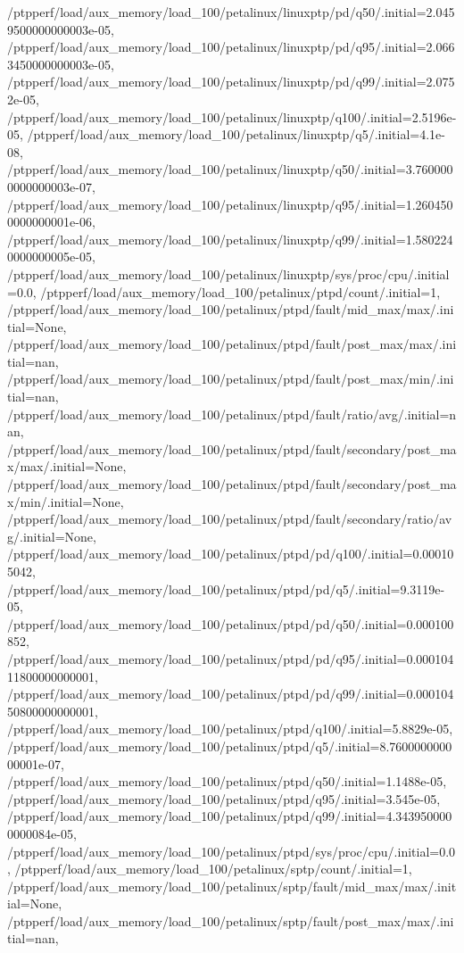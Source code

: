 {    /ptpperf/load/aux_memory/load_100/petalinux/linuxptp/pd/q50/.initial=2.0459500000000003e-05,
    /ptpperf/load/aux_memory/load_100/petalinux/linuxptp/pd/q95/.initial=2.0663450000000003e-05,
    /ptpperf/load/aux_memory/load_100/petalinux/linuxptp/pd/q99/.initial=2.0752e-05,
    /ptpperf/load/aux_memory/load_100/petalinux/linuxptp/q100/.initial=2.5196e-05,
    /ptpperf/load/aux_memory/load_100/petalinux/linuxptp/q5/.initial=4.1e-08,
    /ptpperf/load/aux_memory/load_100/petalinux/linuxptp/q50/.initial=3.7600000000000003e-07,
    /ptpperf/load/aux_memory/load_100/petalinux/linuxptp/q95/.initial=1.2604500000000001e-06,
    /ptpperf/load/aux_memory/load_100/petalinux/linuxptp/q99/.initial=1.5802240000000005e-05,
    /ptpperf/load/aux_memory/load_100/petalinux/linuxptp/sys/proc/cpu/.initial=0.0,
    /ptpperf/load/aux_memory/load_100/petalinux/ptpd/count/.initial=1,
    /ptpperf/load/aux_memory/load_100/petalinux/ptpd/fault/mid_max/max/.initial=None,
    /ptpperf/load/aux_memory/load_100/petalinux/ptpd/fault/post_max/max/.initial=nan,
    /ptpperf/load/aux_memory/load_100/petalinux/ptpd/fault/post_max/min/.initial=nan,
    /ptpperf/load/aux_memory/load_100/petalinux/ptpd/fault/ratio/avg/.initial=nan,
    /ptpperf/load/aux_memory/load_100/petalinux/ptpd/fault/secondary/post_max/max/.initial=None,
    /ptpperf/load/aux_memory/load_100/petalinux/ptpd/fault/secondary/post_max/min/.initial=None,
    /ptpperf/load/aux_memory/load_100/petalinux/ptpd/fault/secondary/ratio/avg/.initial=None,
    /ptpperf/load/aux_memory/load_100/petalinux/ptpd/pd/q100/.initial=0.000105042,
    /ptpperf/load/aux_memory/load_100/petalinux/ptpd/pd/q5/.initial=9.3119e-05,
    /ptpperf/load/aux_memory/load_100/petalinux/ptpd/pd/q50/.initial=0.000100852,
    /ptpperf/load/aux_memory/load_100/petalinux/ptpd/pd/q95/.initial=0.00010411800000000001,
    /ptpperf/load/aux_memory/load_100/petalinux/ptpd/pd/q99/.initial=0.00010450800000000001,
    /ptpperf/load/aux_memory/load_100/petalinux/ptpd/q100/.initial=5.8829e-05,
    /ptpperf/load/aux_memory/load_100/petalinux/ptpd/q5/.initial=8.760000000000001e-07,
    /ptpperf/load/aux_memory/load_100/petalinux/ptpd/q50/.initial=1.1488e-05,
    /ptpperf/load/aux_memory/load_100/petalinux/ptpd/q95/.initial=3.545e-05,
    /ptpperf/load/aux_memory/load_100/petalinux/ptpd/q99/.initial=4.3439500000000084e-05,
    /ptpperf/load/aux_memory/load_100/petalinux/ptpd/sys/proc/cpu/.initial=0.0,
    /ptpperf/load/aux_memory/load_100/petalinux/sptp/count/.initial=1,
    /ptpperf/load/aux_memory/load_100/petalinux/sptp/fault/mid_max/max/.initial=None,
    /ptpperf/load/aux_memory/load_100/petalinux/sptp/fault/post_max/max/.initial=nan,
}
